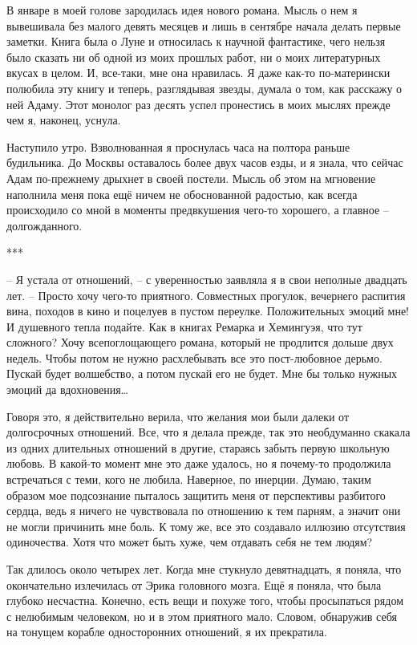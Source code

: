 \documentclass[
]{book}
\begin{document}
В январе в моей голове зародилась идея нового романа. Мысль о нем я вывешивала без малого девять месяцев и лишь в сентябре начала делать первые заметки. Книга была о Луне и относилась к научной фантастике, чего нельзя было сказать ни об одной из моих прошлых работ, ни о моих литературных вкусах в целом. И, все-таки, мне она нравилась. Я даже как-то по-матерински полюбила эту книгу и теперь, разглядывая звезды, думала о том, как расскажу о ней Адаму. Этот монолог раз десять успел пронестись в моих мыслях прежде чем я, наконец, уснула.

Наступило утро. Взволнованная я проснулась часа на полтора раньше будильника. До Москвы оставалось более двух часов езды, и я знала, что сейчас Адам по-прежнему дрыхнет в своей постели. Мысль об этом на мгновение наполнила меня пока ещё ничем не обоснованной радостью, как всегда происходило со мной в моменты предвкушения чего-то хорошего, а главное -- долгожданного.

***

-- Я устала от отношений, -- с уверенностью заявляла я в свои неполные двадцать лет. -- Просто хочу чего-то приятного. Совместных прогулок, вечернего распития вина, походов в кино и поцелуев в пустом переулке. Положительных эмоций мне! И душевного тепла подайте. Как в книгах Ремарка и Хемингуэя, что тут сложного? Хочу всепоглощающего романа, который не продлится дольше двух недель. Чтобы потом не нужно расхлебывать все это пост-любовное дерьмо. Пускай будет волшебство, а потом пускай его не будет. Мне бы только нужных эмоций да вдохновения\ldots{}

Говоря это, я действительно верила, что желания мои были далеки от долгосрочных отношений. Все, что я делала прежде, так это необдуманно скакала из одних длительных отношений в другие, стараясь забыть первую школьную любовь. В какой-то момент мне это даже удалось, но я почему-то продолжила встречаться с теми, кого не любила. Наверное, по инерции. Думаю, таким образом мое подсознание пыталось защитить меня от перспективы разбитого сердца, ведь я ничего не чувствовала по отношению к тем парням, а значит они не могли причинить мне боль. К тому же, все это создавало иллюзию отсутствия одиночества. Хотя что может быть хуже, чем отдавать себя не тем людям?

Так длилось около четырех лет. Когда мне стукнуло девятнадцать, я поняла, что окончательно излечилась от Эрика головного мозга. Ещё я поняла, что была глубоко несчастна. Конечно, есть вещи и похуже того, чтобы просыпаться рядом с нелюбимым человеком, но и в этом приятного мало. Словом, обнаружив себя на тонущем корабле односторонних отношений, я их прекратила.
\end{document}
